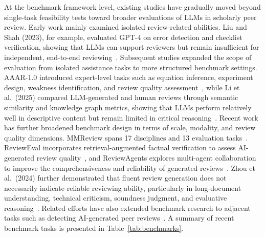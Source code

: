 \documentclass[preprint,10pt,times]{elsarticle}
\begin{document}
At the benchmark framework level, existing studies have gradually moved beyond single-task feasibility tests toward broader evaluations of LLMs in scholarly peer review. Early work mainly examined isolated review-related abilities. Liu and Shah (2023), for example, evaluated GPT-4 on error detection and checklist verification, showing that LLMs can support reviewers but remain insufficient for independent, end-to-end reviewing~\cite{ref32}. Subsequent studies expanded the scope of evaluation from isolated assistance tasks to more structured benchmark settings. AAAR-1.0 introduced expert-level tasks such as equation inference, experiment design, weakness identification, and review quality assessment~\cite{ref33}, while Li et al.\ (2025) compared LLM-generated and human reviews through semantic similarity and knowledge graph metrics, showing that LLMs perform relatively well in descriptive content but remain limited in critical reasoning~\cite{ref8}. Recent work has further broadened benchmark design in terms of scale, modality, and review quality dimensions. MMReview spans 17 disciplines and 13 evaluation tasks~\cite{ref10}. ReviewEval incorporates retrieval-augmented factual verification to assess AI-generated review quality~\cite{ref21}, and ReviewAgents explores multi-agent collaboration to improve the comprehensiveness and reliability of generated reviews~\cite{ref34}. Zhou et al.\ (2024) further demonstrated that fluent review generation does not necessarily indicate reliable reviewing ability, particularly in long-document understanding, technical criticism, soundness judgment, and evaluative reasoning~\cite{ref35}. Related efforts have also extended benchmark research to adjacent tasks such as detecting AI-generated peer reviews~\cite{ref36}. A summary of recent benchmark tasks is presented in Table~\ref{tab:benchmarks}.
\end{document}
